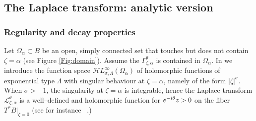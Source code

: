\documentclass{article}
\let\Re\relax
\DeclareMathOperator{\Re}{Re}
\newcommand{\singexp}[2]{\mathcal{H}L^\infty_{#1, #2}}
\theoremstyle{definition}
\newcommand{\laplace}{\mathcal{L}}
\begin{document}
\subsection{The Laplace transform: analytic version}
\subsubsection{Regularity and decay properties}\label{reg-decay}

Let $\Omega_\alpha\subset B$ be an open, simply connected set that touches but does not contain $\zeta=\alpha$ (see Figure \ref{Fig:domain}). Assume the $\Gamma_{\zeta,\alpha}^\theta$ is contained in $\Omega_\alpha$. In \cite{reg-sing-volterra} we introduce the function space $\singexp{\sigma}{\Lambda}(\Omega_\alpha)$ of holomorphic functions of exponential type $\Lambda$ with singular behaviour at $\zeta=\alpha$, namely of the form $|\zeta|^\sigma$. When $\sigma>-1$, the singularity at $\zeta=\alpha$ is integrable, hence the Laplace transform $\laplace_{\zeta,\alpha}^\theta$ is a well--defined and holomorphic function for $\Re e^{-i\theta}z>0$ on the fiber $T^*B\vert_{\zeta=0}$ (see for instance ~\cite[Section  5.6]{diverg-resurg-i}.)    
\end{document}
